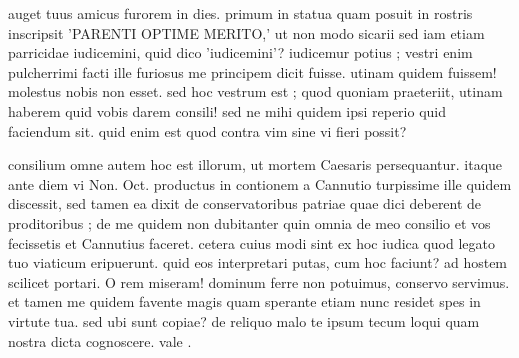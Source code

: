 


 auget tuus amicus furorem in dies. primum in statua quam posuit in rostris inscripsit 'PARENTI OPTIME MERITO,' ut non modo sicarii sed iam etiam parricidae iudicemini, quid dico 'iudicemini'? iudicemur potius ; vestri enim pulcherrimi facti ille furiosus me principem dicit fuisse. utinam quidem fuissem! molestus nobis non esset. sed hoc vestrum est ; quod quoniam praeteriit, utinam haberem quid vobis darem consili! sed ne mihi quidem ipsi reperio quid faciendum sit. quid enim est quod contra vim sine vi fieri possit?

 consilium omne autem hoc est illorum, ut mortem Caesaris persequantur. itaque ante diem vi Non. Oct. productus in contionem a Cannutio turpissime ille quidem discessit, sed tamen ea dixit de conservatoribus patriae quae dici deberent de proditoribus ; de me quidem non dubitanter quin omnia de meo consilio et vos fecissetis et Cannutius faceret. cetera cuius modi sint ex hoc iudica quod legato tuo viaticum eripuerunt. quid eos interpretari putas, cum hoc faciunt? ad hostem scilicet portari. O rem miseram! dominum ferre non potuimus, conservo servimus. et tamen me quidem favente magis quam sperante etiam nunc residet spes in virtute tua. sed ubi sunt copiae? de reliquo malo te ipsum tecum loqui quam nostra dicta cognoscere. vale .
